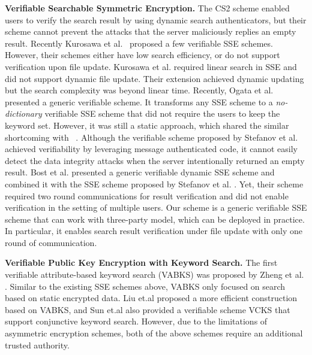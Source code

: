 \noindent\textbf{Verifiable Searchable Symmetric Encryption.} The CS2 scheme \cite{kamara2011cs2} enabled users to verify the search result by using dynamic search authenticators, but their scheme cannot prevent the attacks that the server maliciously replies an empty result.
Recently Kurosawa et al.~\cite{kurosawa2012uc,kurosawa2013update,ogataefficient} proposed a few verifiable SSE schemes. However, their schemes either have low search efficiency, or do not support verification upon file update.
Kurosawa et al. \cite{kurosawa2012uc} required linear search in SSE and did not support dynamic file update. Their extension \cite{kurosawa2013update} achieved dynamic updating but the search complexity was beyond linear time. Recently, Ogata et al. \cite{ogataefficient} presented a generic verifiable scheme. It transforms any SSE scheme to a \textit{no-dictionary} verifiable SSE scheme that did not require the users to keep the keyword set. However, it was still a static approach, which shared the similar shortcoming with~\cite{chai2012verifiable} \cite{cheng2015verifiable}.
Although the verifiable scheme proposed by Stefanov et al.\cite{stefanov2014practical} achieved verifiability by leveraging message authenticated code, it cannot easily detect the data integrity attacks when the server intentionally returned an empty result.
Bost et al. \cite{bost2016verifiable} presented a generic verifiable dynamic SSE scheme and combined it with the SSE scheme proposed by Stefanov et al. \cite{stefanov2014practical}.
Yet, their scheme required two round communications for result verification and did not enable verification in the setting of multiple users. Our \name scheme is a generic verifiable SSE scheme that can work with three-party model, which can be  deployed in practice. In particular, it enables search result verification under file update with only one round of communication.


\noindent\textbf{Verifiable Public Key Encryption with Keyword Search.} The first verifiable attribute-based keyword search (VABKS) was proposed by Zheng et al. \cite{zheng2014vabks}. Similar to the existing SSE schemes above, VABKS only focused on search based on static encrypted data. Liu et.al \cite{liu2014efficient} proposed a more efficient construction based on VABKS, and Sun et.al \cite{sun2015catch} also provided a verifiable scheme VCKS that support conjunctive keyword search. However, due to the limitations of asymmetric encryption schemes, both of the above schemes require an additional trusted authority.


